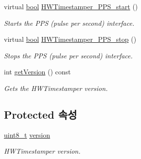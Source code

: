 \begin{DoxyCompactItemize}
virtual \hyperlink{avb__gptp_8h_af6a258d8f3ee5206d682d799316314b1}{bool} \hyperlink{class_common_timestamper_a2cbaeb84807ca61af0bc56bcc475468d}{H\+W\+Timestamper\+\_\+\+P\+P\+S\+\_\+start} ()
\begin{DoxyCompactList}\small\item\em Starts the P\+PS (pulse per second) interface. \end{DoxyCompactList}\item 
virtual \hyperlink{avb__gptp_8h_af6a258d8f3ee5206d682d799316314b1}{bool} \hyperlink{class_common_timestamper_ac5d9f1e5eb402dffaa8897367e9fd7d3}{H\+W\+Timestamper\+\_\+\+P\+P\+S\+\_\+stop} ()
\begin{DoxyCompactList}\small\item\em Stops the P\+PS (pulse per second) interface. \end{DoxyCompactList}\item 
int \hyperlink{class_common_timestamper_a4d1414f8d9ed8d83c91769b148106307}{get\+Version} () const 
\begin{DoxyCompactList}\small\item\em Gets the H\+W\+Timestamper version. \end{DoxyCompactList}\end{DoxyCompactItemize}
\subsection*{Protected 속성}
\begin{DoxyCompactItemize}
\item 
\hyperlink{stdint_8h_aba7bc1797add20fe3efdf37ced1182c5}{uint8\+\_\+t} \hyperlink{class_common_timestamper_ab22abc2906422da61885ac6c8e6a1a59}{version}
\begin{DoxyCompactList}\small\item\em H\+W\+Timestamper version. \end{DoxyCompactList}\end{DoxyCompactItemize}
